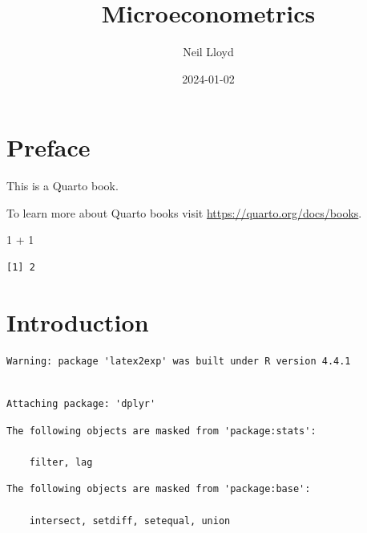 \documentclass[
  letterpaper,
  DIV=11,
  numbers=noendperiod]{scrreprt}
\title{Microeconometrics}
\author{Neil Lloyd}
\date{2024-01-02}
\newenvironment{Shaded}{\begin{snugshade}}{\end{snugshade}}
\newcommand{\DecValTok}[1]{\textcolor[rgb]{0.68,0.00,0.00}{#1}}
\newcommand{\SpecialCharTok}[1]{\textcolor[rgb]{0.37,0.37,0.37}{#1}}
\renewcommand*\contentsname{Table of contents}
\newcommand\contentsname{Table of contents}
\theoremstyle{definition}
\theoremstyle{remark}
\begin{document}
\maketitle

\renewcommand*\contentsname{Table of contents}
{
\hypersetup{linkcolor=}
\setcounter{tocdepth}{2}
\tableofcontents
}

\chapter*{Preface}\label{preface}


This is a Quarto book.

To learn more about Quarto books visit
\url{https://quarto.org/docs/books}.

\begin{Shaded}
\begin{Highlighting}[]
\DecValTok{1} \SpecialCharTok{+} \DecValTok{1}
\end{Highlighting}
\end{Shaded}

\begin{verbatim}
[1] 2
\end{verbatim}


\chapter{Introduction}\label{introduction}

\begin{verbatim}
Warning: package 'latex2exp' was built under R version 4.4.1
\end{verbatim}

\begin{verbatim}

Attaching package: 'dplyr'
\end{verbatim}

\begin{verbatim}
The following objects are masked from 'package:stats':

    filter, lag
\end{verbatim}

\begin{verbatim}
The following objects are masked from 'package:base':

    intersect, setdiff, setequal, union
\end{verbatim}
\end{document}
